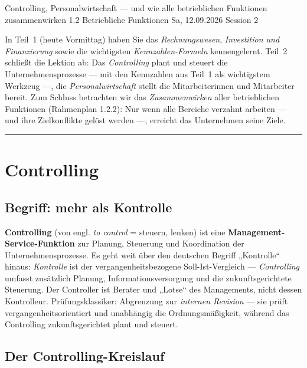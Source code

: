 \documentclass[11pt, a4paper]{article}
\begin{document}
%
  {Controlling, Personalwirtschaft --- und wie alle betrieblichen Funktionen zusammenwirken}%
  {1.2 Betriebliche Funktionen}%
  {Sa, 12.09.2026 \textperiodcentered{} Session 2}

\begin{merksatz}[title={\bfseries Worum geht es in dieser Session?}]
In Teil~1 (heute Vormittag) haben Sie das \emph{Rechnungswesen}, \emph{Investition und
Finanzierung} sowie die wichtigsten \emph{Kennzahlen-Formeln} kennengelernt. Teil~2
schließt die Lektion ab: Das \emph{Controlling} plant und steuert die
Unternehmensprozesse --- mit den Kennzahlen aus Teil~1 als wichtigstem Werkzeug ---, die
\emph{Personalwirtschaft} stellt die Mitarbeiterinnen und Mitarbeiter bereit. Zum Schluss
betrachten wir das \emph{Zusammenwirken} aller betrieblichen Funktionen (Rahmenplan
1.2.2): Nur wenn alle Bereiche verzahnt arbeiten --- und ihre Zielkonflikte gelöst
werden ---, erreicht das Unternehmen seine Ziele.
\end{merksatz}

\tableofcontents
\vspace{1em}
\hrule
\vspace{1em}

\section{Controlling}

\subsection{Begriff: mehr als Kontrolle}

\textbf{Controlling} (von engl. \emph{to control} = steuern, lenken) ist eine
\textbf{Management-Service-Funktion} zur Planung, Steuerung und Koordination der
Unternehmensprozesse. Es geht weit über den deutschen Begriff „Kontrolle`` hinaus:
\emph{Kontrolle} ist der vergangenheitsbezogene Soll-Ist-Vergleich --- \emph{Controlling}
umfasst zusätzlich Planung, Informationsversorgung und die zukunftsgerichtete Steuerung.
Der Controller ist Berater und „Lotse`` des Managements, nicht dessen Kontrolleur.
Prüfungsklassiker: Abgrenzung zur \emph{internen Revision} --- sie prüft
vergangenheitsorientiert und unabhängig die Ordnungsmäßigkeit, während das Controlling
zukunftsgerichtet plant und steuert.

\subsection{Der Controlling-Kreislauf}
\end{document}

